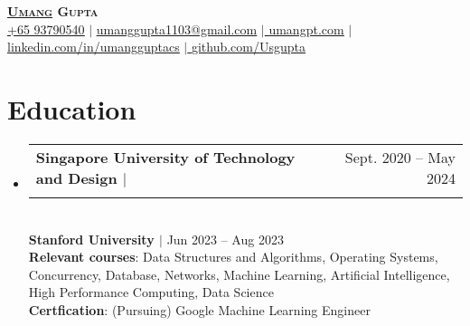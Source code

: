 \documentclass[letterpaper,11pt]{article}
\makeatletter
\newcommand{\resumeSubheading}[4]{
  \vspace{-2pt}\item
    \begin{tabular*}{0.97\textwidth}[t]{l@{\extracolsep{\fill}}r}
      \textbf{#1} & \footnotesize{#2} \\
      {\small#3} & {\footnotesize #4} \\
    \end{tabular*}\vspace{-7pt}
}
\newcommand{\resumeSubHeadingListStart}{\begin{itemize}[leftmargin=0.15in, label={}]}
\newcommand{\resumeSubHeadingListEnd}{\end{itemize}}
\makeatother
\begin{document}



\begin{center}
    \textbf{\huge \scshape \underline{Umang} Gupta} \\ \vspace{2pt}
    \footnotesize \href{tel:+6593790540}{  \footnotesize \underline {+65 93790540}}
  $|$ \href{mailto:umanggupta1103@gmail.com}{ \underline{umanggupta1103@gmail.com}}
    $|$\href{https://umangpt.com}{  \underline{umangpt.com}}
    $|$ \href{https://linkedin.com/in/umangguptacs}{ \footnotesize \underline{linkedin.com/in/umangguptacs}} $|$\href{https://github.com/Usgupta}{  \underline{github.com/Usgupta}}
    
\end{center}


\section{Education}
  \resumeSubHeadingListStart
    \resumeSubheading
      {Singapore University of Technology and Design $|$ \normalfont {{GPA 4.46/5.0, Honors List}}} {	{Sept. 2020 -- May 2024}}
      {\normalfont{Bachelor of Engineering in Computer Science, Minor in Artificial Intelligence}}{}
      \vspace{1mm}
       \\\textbf{Stanford University $|$ } \hspace{48mm} {\footnotesize	\hspace{3mm} {Jun 2023 -- Aug 2023}}
        \vspace{1mm}
      \\\textbf{Relevant courses}{: Data Structures and Algorithms, Operating Systems, Concurrency, Database, Networks, Machine Learning, Artificial Intelligence, High Performance Computing, Data Science}
      \vspace{1mm}
      \\\textbf{Certfication}{: (Pursuing) Google Machine Learning Engineer }
  \resumeSubHeadingListEnd
\end{document}
